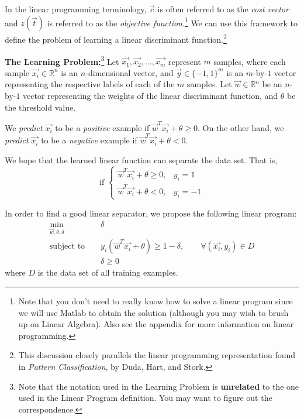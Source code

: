 \begin{enumerate}
In the linear programming terminology, $\vec{c}$ is often referred
to as the {\em cost vector} and $z(\vec{t})$ is referred to as the {\em objective
function}.\footnote{Note that you don't need
to really know how to solve a linear program since we will use Matlab to obtain the
solution (although you may wish to brush up on Linear Algebra). 
Also see the appendix for more information on linear programming.}
We can use this framework to define the problem of learning a linear
discriminant function.\footnote{This discussion closely
  parallels the linear programming representation found in 
  {\em Pattern Classification}, by Duda, Hart, and Stork.}

\textbf{The Learning Problem:}\footnote{Note that the notation used in the
Learning Problem is
{\bf unrelated} to the one used in the Linear Program definition. You may want to
figure out the correspondence.} \hspace{2mm}
Let $\vec{x_1}, \vec{x_2}, \ldots, \vec{x_m}$ 
represent $m$ samples, where each sample $\vec{x_i}\in \mathbb{R}^n$ is an $n$-dimensional
vector, and $\vec{y} \in \{-1, 1\}^m$ is an $m$-by-$1$
vector representing the respective labels of each of the $m$ samples. Let
$\vec{w} \in \mathbb{R}^n$ be an $n$-by-$1$ vector representing the weights of the
linear discriminant function, and $\theta$ be the threshold value. 

We {\em predict} $\vec{x_i}$ to be a {\em positive} example if
$\vec{w}^T \vec{x_i} + \theta \geq 0$. On the other hand, we {\em predict}
$\vec{x_i}$ to be a {\em negative} example if $\vec{w}^T \vec{x_i} + \theta < 0$.

We hope that the learned linear function can separate the data set.  
That is, 
\begin{equation}
\textrm{if } \left\{
\begin{array}{cc}
\vec{w}^T \vec{x_i} + \theta \geq 0, & y_i = 1 \\
\vec{w}^T \vec{x_i} + \theta < 0, & y_i = -1
\end{array}
\right. \label{eq:separable}
\end{equation}

In order to find a good linear separator, we propose the following linear program:
\begin{eqnarray}
  \min_{\vec{w}, \theta, \delta} & & \delta  \label{eq:lin_prog_discriminant_obj}\\
 \textrm{subject to } & & y_i(\vec{w}^T \vec{x_i} + \theta) \geq 1 - \delta, \qquad \forall (\vec{x_i},y_i) \in D  \label{eq:lin_prog_discriminant_constraint}\\
  & & \delta \geq 0  \label{eq:lin_prog_discriminant_bound}
\end{eqnarray}
where $D$ is the data set of all training examples.
\begin{enumerate}


\end{enumerate}
\end{enumerate}
